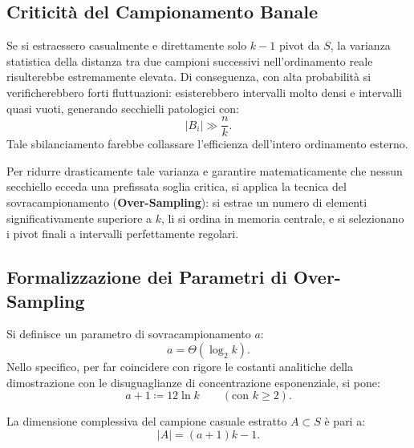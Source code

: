 \subsection{Criticità del Campionamento Banale}
Se si estraessero casualmente e direttamente solo $k - 1$ pivot da $S$, la varianza statistica della distanza tra due campioni successivi nell'ordinamento reale risulterebbe estremamente elevata. Di conseguenza, con alta probabilità si verificherebbero forti fluttuazioni: esisterebbero intervalli molto densi e intervalli quasi vuoti, generando secchielli patologici con:
\begin{equation}
  |B_i| \gg \frac{n}{k}.
\end{equation}
Tale sbilanciamento farebbe collassare l'efficienza dell'intero ordinamento esterno.

Per ridurre drasticamente tale varianza e garantire matematicamente che nessun secchiello ecceda una prefissata soglia critica, si applica la tecnica del sovracampionamento (\textbf{Over-Sampling}): si estrae un numero di elementi significativamente superiore a $k$, li si ordina in memoria centrale, e si selezionano i pivot finali a intervalli perfettamente regolari.

\FloatBarrier
\subsection{Formalizzazione dei Parametri di Over-Sampling}
Si definisce un parametro di sovracampionamento $a$:
\begin{equation}
  a = \Theta(\log_2 k).
\end{equation}
Nello specifico, per far coincidere con rigore le costanti analitiche della dimostrazione con le disuguaglianze di concentrazione esponenziale, si pone:
\begin{equation}
  a + 1 \coloneqq 12 \ln k \qquad (\text{con } k \ge 2).
  \label{eq:oversampling-parameter-a}
\end{equation}

La dimensione complessiva del campione casuale estratto $A \subset S$ è pari a:
\begin{equation}
  |A| = (a + 1)k - 1.
  \label{eq:sample-size-a}
\end{equation}

\FloatBarrier
